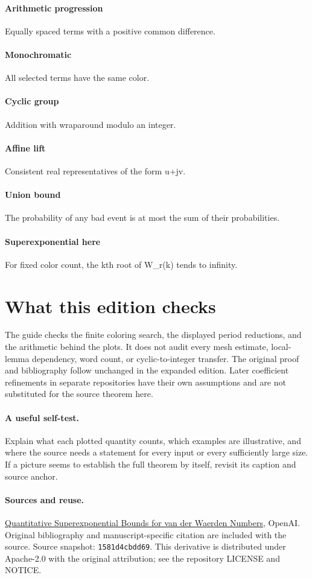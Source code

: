 \documentclass[11pt]{article}
\begin{document}
\paragraph{Arithmetic progression}Equally spaced terms with a positive common difference.
\paragraph{Monochromatic}All selected terms have the same color.
\paragraph{Cyclic group}Addition with wraparound modulo an integer.
\paragraph{Affine lift}Consistent real representatives of the form u+jv.
\paragraph{Union bound}The probability of any bad event is at most the sum of their probabilities.
\paragraph{Superexponential here}For fixed color count, the kth root of W\_r(k) tends to infinity.
\section*{What this edition checks}The guide checks the finite coloring search, the displayed period reductions, and the arithmetic behind the plots. It does not audit every mesh estimate, local-lemma dependency, word count, or cyclic-to-integer transfer. The original proof and bibliography follow unchanged in the expanded edition. Later coefficient refinements in separate repositories have their own assumptions and are not substituted for the source theorem here.
\paragraph{A useful self-test.} Explain what each plotted quantity counts, which examples are illustrative, and where the source needs a statement for every input or every sufficiently large size. If a picture seems to establish the full theorem by itself, revisit its caption and source anchor.\paragraph{Sources and reuse.}\href{https://github.com/openai/math/tree/1581d4cbdd69a0faf34b2089614fe2a814316a6a/preprints/Quantitative-Superexponential-Bounds-for-van-der-Waerden-Numbers-September-23-2026}{Quantitative Superexponential Bounds for van der Waerden Numbers}, OpenAI. Original bibliography and manuscript-specific citation are included with the source. Source snapshot: \texttt{1581d4cbdd69}. This derivative is distributed under Apache-2.0 with the original attribution; see the repository LICENSE and NOTICE.
\end{document}
